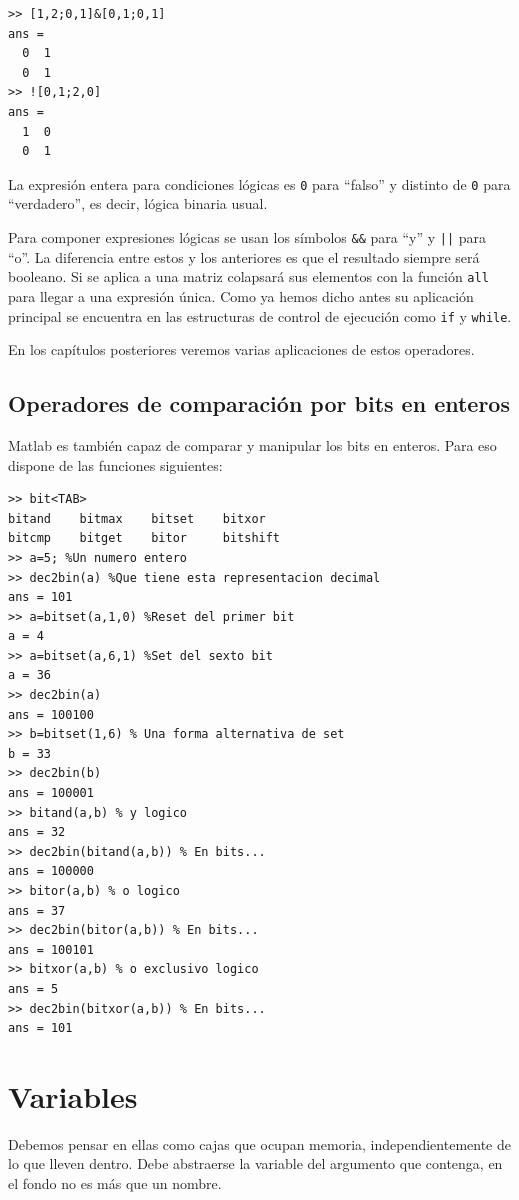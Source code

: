 \begin{verbatim}
>> [1,2;0,1]&[0,1;0,1]
ans =
  0  1
  0  1
>> ![0,1;2,0]
ans =
  1  0
  0  1
\end{verbatim}
La expresión entera para condiciones lógicas es \texttt{0} para
{}``falso'' y distinto de \texttt{0} para {}``verdadero'', es decir,
lógica binaria usual.

Para componer expresiones lógicas se usan los símbolos \texttt{\&\&}
para {}``y'' y \texttt{||} para {}``o''. La diferencia entre estos y
los anteriores es que el resultado siempre será booleano. Si se aplica
a una matriz colapsará sus elementos con la función \texttt{all} para
llegar a una expresión única. Como ya hemos dicho antes su aplicación
principal se encuentra en las estructuras de control de ejecución como
\texttt{if} y \texttt{while}.

En los capítulos posteriores veremos varias aplicaciones de estos
operadores.


\subsection{Operadores de comparación por bits en enteros}

Matlab es también capaz de comparar y manipular los bits en enteros.
Para eso dispone de las funciones siguientes:
\begin{verbatim}
>> bit<TAB>
bitand    bitmax    bitset    bitxor
bitcmp    bitget    bitor     bitshift
>> a=5; %Un numero entero
>> dec2bin(a) %Que tiene esta representacion decimal
ans = 101
>> a=bitset(a,1,0) %Reset del primer bit
a = 4
>> a=bitset(a,6,1) %Set del sexto bit
a = 36
>> dec2bin(a)
ans = 100100
>> b=bitset(1,6) % Una forma alternativa de set
b = 33
>> dec2bin(b)
ans = 100001
>> bitand(a,b) % y logico
ans = 32
>> dec2bin(bitand(a,b)) % En bits...
ans = 100000
>> bitor(a,b) % o logico
ans = 37
>> dec2bin(bitor(a,b)) % En bits...
ans = 100101
>> bitxor(a,b) % o exclusivo logico
ans = 5
>> dec2bin(bitxor(a,b)) % En bits...
ans = 101
\end{verbatim}

\section{Variables}

Debemos pensar en ellas como cajas que ocupan memoria,
independientemente de lo que lleven dentro. Debe abstraerse la
variable del argumento que contenga, en el fondo no es más que un
nombre.


